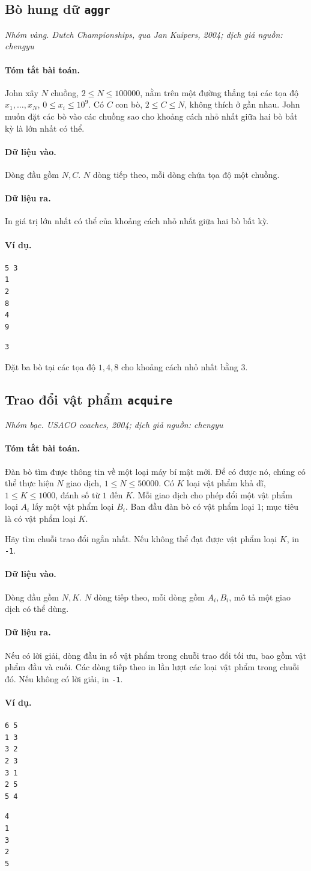 \documentclass[11pt]{article}
\newcommand{\problem}[4]{%
  \subsection[#1 (#2)]{#1 \hfill {\normalsize\texttt{#2}}}%
  \noindent\textit{#3. #4}\par\smallskip
}
\newcommand{\iosec}[1]{\paragraph{#1}}
\begin{document}
\problem{Bò hung dữ}{aggr}{Nhóm vàng}{Dutch Championships, qua Jan Kuipers, 2004; dịch giả nguồn: chengyu}

\iosec{Tóm tắt bài toán.}
John xây \(N\) chuồng, \(2\le N\le 100000\), nằm trên một đường thẳng tại các
tọa độ \(x_1,\ldots,x_N\), \(0\le x_i\le 10^9\). Có \(C\) con bò,
\(2\le C\le N\), không thích ở gần nhau. John muốn đặt các bò vào các chuồng
sao cho khoảng cách nhỏ nhất giữa hai bò bất kỳ là lớn nhất có thể.

\iosec{Dữ liệu vào.}
Dòng đầu gồm \(N,C\). \(N\) dòng tiếp theo, mỗi dòng chứa tọa độ một chuồng.

\iosec{Dữ liệu ra.}
In giá trị lớn nhất có thể của khoảng cách nhỏ nhất giữa hai bò bất kỳ.

\iosec{Ví dụ.}
\begin{verbatim}
5 3
1
2
8
4
9
\end{verbatim}

\begin{verbatim}
3
\end{verbatim}

Đặt ba bò tại các tọa độ \(1,4,8\) cho khoảng cách nhỏ nhất bằng \(3\).

\problem{Trao đổi vật phẩm}{acquire}{Nhóm bạc}{USACO coaches, 2004; dịch giả nguồn: chengyu}

\iosec{Tóm tắt bài toán.}
Đàn bò tìm được thông tin về một loại máy bí mật mới. Để có được nó, chúng có
thể thực hiện \(N\) giao dịch, \(1\le N\le 50000\). Có \(K\) loại vật phẩm khả
dĩ, \(1\le K\le 1000\), đánh số từ \(1\) đến \(K\). Mỗi giao dịch cho phép đổi
một vật phẩm loại \(A_i\) lấy một vật phẩm loại \(B_i\). Ban đầu đàn bò có vật
phẩm loại \(1\); mục tiêu là có vật phẩm loại \(K\).

Hãy tìm chuỗi trao đổi ngắn nhất. Nếu không thể đạt được vật phẩm loại \(K\),
in \texttt{-1}.

\iosec{Dữ liệu vào.}
Dòng đầu gồm \(N,K\). \(N\) dòng tiếp theo, mỗi dòng gồm \(A_i,B_i\), mô tả
một giao dịch có thể dùng.

\iosec{Dữ liệu ra.}
Nếu có lời giải, dòng đầu in số vật phẩm trong chuỗi trao đổi tối ưu, bao gồm
vật phẩm đầu và cuối. Các dòng tiếp theo in lần lượt các loại vật phẩm trong
chuỗi đó. Nếu không có lời giải, in \texttt{-1}.

\iosec{Ví dụ.}
\begin{verbatim}
6 5
1 3
3 2
2 3
3 1
2 5
5 4
\end{verbatim}

\begin{verbatim}
4
1
3
2
5
\end{verbatim}
\end{document}
